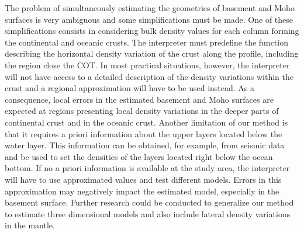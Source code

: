 \documentclass[manuscript]{geophysics}
\begin{document}
The problem of simultaneously estimating the geometries of basement and Moho surfaces
is very ambiguous and some simplifications must be made. 
One of these simplifications consists in considering bulk density 
values for each column forming the continental and oceanic crusts. 
The interpreter must predefine the function describing the horizontal density
variation of the crust along the profile, including the region 
close the COT.
In most practical situations, however, the interpreter will not have access to a detailed
description of the density variations within the crust and a regional approximation
will have to be used instead.
As a consequence, local errors in the estimated basement and Moho surfaces are expected 
at regions presenting local density variations in the deeper parts of continental crust 
and in the oceanic crust.
Another limitation of our method is that it requires a priori information about the
upper layers located below the water layer.
This information can be obtained, for example, from seismic data and be used to set
the densities of the layers located right below the ocean bottom.
If no a priori information is available at the study area, the interpreter will have to use
approximated values and test different models.
Errors in this approximation may negatively impact the estimated model, especially in 
the basement surface.
Further research could be conducted to generalize our method to estimate
three dimensional models and also include lateral density variations in 
the mantle.



\end{document}
